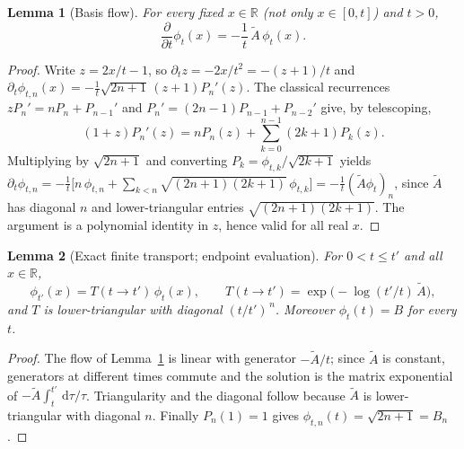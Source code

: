 \documentclass[11pt]{article}
\newtheorem{lemma}{Lemma}
\newcommand{\R}{\mathbb{R}}
\newcommand{\dd}{\,\mathrm{d}}
\newcommand{\At}{\widetilde{A}}
\begin{document}
\begin{lemma}[Basis flow]\label{lem:flow}
For every fixed $x\in\R$ (not only $x\in[0,t]$) and $t>0$,
\begin{equation}
    \frac{\partial}{\partial t}\phi_t(x)=-\frac1t\,\At\,\phi_t(x).
\end{equation}
\end{lemma}
\begin{proof}
Write $z=2x/t-1$, so $\partial_t z=-2x/t^2=-(z+1)/t$ and
$\partial_t\phi_{t,n}(x)=-\tfrac1t\sqrt{2n+1}\,(z+1)P_n'(z)$.
The classical recurrences $zP_n'=nP_n+P_{n-1}'$ and $P_n'=(2n-1)P_{n-1}+P_{n-2}'$ give, by telescoping,
\begin{equation}
    (1+z)P_n'(z)=nP_n(z)+\sum_{k=0}^{n-1}(2k+1)P_k(z).
\end{equation}
Multiplying by $\sqrt{2n+1}$ and converting $P_k=\phi_{t,k}/\sqrt{2k+1}$ yields
$\partial_t\phi_{t,n}=-\tfrac1t\big[n\,\phi_{t,n}+\sum_{k<n}\sqrt{(2n+1)(2k+1)}\,\phi_{t,k}\big]
=-\tfrac1t(\At\phi_t)_n$, since $\At$ has diagonal $n$ and lower-triangular entries $\sqrt{(2n+1)(2k+1)}$. The argument is a polynomial identity in $z$, hence valid for all real $x$.
\end{proof}

\begin{lemma}[Exact finite transport; endpoint evaluation]\label{lem:prop}
For $0<t\le t'$ and all $x\in\R$,
\begin{equation}
    \phi_{t'}(x)=T(t\!\to\!t')\,\phi_t(x),\qquad
    T(t\!\to\!t')=\exp\!\big(-\log(t'/t)\,\At\big),
\end{equation}
and $T$ is lower-triangular with diagonal $(t/t')^{\,n}$. Moreover $\phi_t(t)=B$ for every $t$.
\end{lemma}
\begin{proof}
The flow of Lemma~\ref{lem:flow} is linear with generator $-\At/t$; since $\At$ is constant, generators at different times commute and the solution is the matrix exponential of $-\At\int_t^{t'}\dd\tau/\tau$. Triangularity and the diagonal follow because $\At$ is lower-triangular with diagonal $n$. Finally $P_n(1)=1$ gives $\phi_{t,n}(t)=\sqrt{2n+1}=B_n$.
\end{proof}
\end{document}
